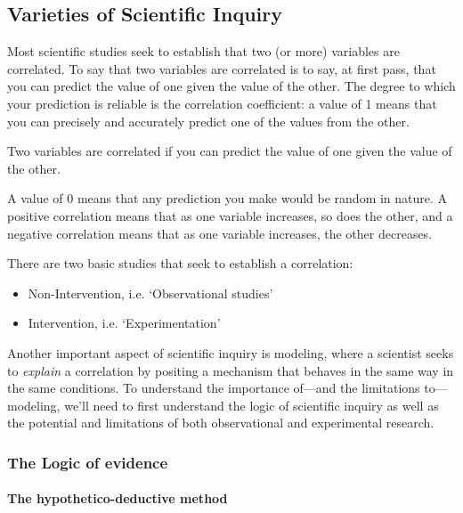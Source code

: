 \begin{refsection}
\subsection{Varieties of Scientific Inquiry}
\label{varietiesofscientificinquiry}

Most scientific studies seek to establish that two (or more) variables are correlated. To say that two variables are correlated is to say, at first pass, that you can predict the value of one given the value of the other. The degree to which your prediction is reliable is the correlation coefficient: a value of 1 means that you can precisely and accurately predict one of the values from the other. \begin{thesis}[Correlation]Two variables are correlated if you can predict the value of one given the value of the other.\end{thesis}

A value of 0 means that any prediction you make would be random in nature. A positive correlation means that as one variable increases, so does the other, and a negative correlation means that as one variable increases, the other decreases. 

There are two basic studies that seek to establish a correlation:

\begin{itemize}
\item Non-Intervention, i.e. `Observational studies'

\item Intervention, i.e. `Experimentation'

\end{itemize}

Another important aspect of scientific inquiry is modeling, where a scientist seeks to \emph{explain} a correlation by positing a mechanism that behaves in the same way in the same conditions. To understand the importance of---and the limitations to---modeling, we'll need to first understand the logic of scientific inquiry as well as the potential and limitations of both observational and experimental research.

\subsubsection{The Logic of evidence}
\label{thelogicofevidence}

\paragraph{The hypothetico-deductive method}
\label{thehypothetico-deductivemethod}


\end{refsection}
